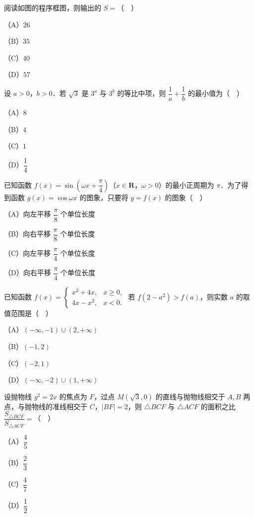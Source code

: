 \begin{question}
阅读如图的程序框图，则输出的 $S=$（　）
\nopagebreak[4]
\begin{center}\end{center}
\nopagebreak[4]
（A）$26$

（B）$35$

（C）$40$

（D）$57$

\end{question}
\begin{question}
设 $a>0$，$b>0$．若 $\sqrt3$ 是 $3^a$ 与 $3^b$ 的等比中项，则 $\dfrac1a+\dfrac1b$ 的最小值为（　）

（A）$8$

（B）$4$

（C）$1$

（D）$\dfrac14$

\end{question}
\begin{question}
已知函数 $f(x)=\sin\left(\omega x+\dfrac{\pi}{4}\right)$（$x\in\mathbf R$，$\omega>0$）的最小正周期为 $\pi$．为了得到函数 $g(x)=\cos\omega x$ 的图象，只要将 $y=f(x)$ 的图象（　）

（A）向左平移 $\dfrac{\pi}{8}$ 个单位长度

（B）向右平移 $\dfrac{\pi}{8}$ 个单位长度

（C）向左平移 $\dfrac{\pi}{4}$ 个单位长度

（D）向右平移 $\dfrac{\pi}{4}$ 个单位长度

\end{question}
\begin{question}
已知函数 $f(x)=\begin{cases}x^2+4x,&x\geqslant0,\\ 4x-x^2,&x<0.\end{cases}$ 若 $f(2-a^2)>f(a)$，则实数 $a$ 的取值范围是（　）

（A）$(-\infty,-1)\cup(2,+\infty)$

（B）$(-1,2)$

（C）$(-2,1)$

（D）$(-\infty,-2)\cup(1,+\infty)$

\end{question}
\begin{question}
设抛物线 $y^2=2x$ 的焦点为 $F$，过点 $M(\sqrt3,0)$ 的直线与抛物线相交于 $A,B$ 两点，与抛物线的准线相交于 $C$，$|BF|=2$，则 $\triangle BCF$ 与 $\triangle ACF$ 的面积之比 $\dfrac{S_{\triangle BCF}}{S_{\triangle ACF}}=$（　）

（A）$\dfrac45$

（B）$\dfrac23$

（C）$\dfrac47$

（D）$\dfrac12$

\end{question}
